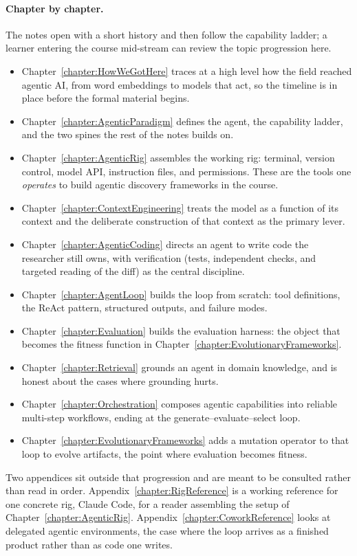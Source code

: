 \paragraph{Chapter by chapter.}
The notes open with a short history and then follow the capability ladder; a learner entering the course mid-stream can review the topic progression here.
\begin{itemize}
\item Chapter~\ref{chapter:HowWeGotHere} traces at a high level how the field reached agentic AI, from word embeddings to models that act, so the timeline is in place before the formal material begins.
\item Chapter~\ref{chapter:AgenticParadigm} defines the agent, the capability ladder, and the two spines the rest of the notes builds on.
\item Chapter~\ref{chapter:AgenticRig} assembles the working rig: terminal, version control, model API, instruction files, and permissions. These are the tools one \emph{operates} to build agentic discovery frameworks in the course.
\item Chapter~\ref{chapter:ContextEngineering} treats the model as a function of its context and the deliberate construction of that context as the primary lever.
\item Chapter~\ref{chapter:AgenticCoding} directs an agent to write code the researcher still owns, with verification (tests, independent checks, and targeted reading of the diff) as the central discipline.
\item Chapter~\ref{chapter:AgentLoop} builds the loop from scratch: tool definitions, the ReAct pattern, structured outputs, and failure modes.
\item Chapter~\ref{chapter:Evaluation} builds the evaluation harness: the object that becomes the fitness function in Chapter~\ref{chapter:EvolutionaryFrameworks}.
\item Chapter~\ref{chapter:Retrieval} grounds an agent in domain knowledge, and is honest about the cases where grounding hurts.
\item Chapter~\ref{chapter:Orchestration} composes agentic capabilities into reliable multi-step workflows, ending at the generate--evaluate--select loop.
\item Chapter~\ref{chapter:EvolutionaryFrameworks} adds a mutation operator to that loop to evolve artifacts, the point where evaluation becomes fitness.
\end{itemize}
Two appendices sit outside that progression and are meant to be consulted rather than read in order.
Appendix~\ref{chapter:RigReference} is a working reference for one concrete rig, Claude Code, for a reader assembling the setup of Chapter~\ref{chapter:AgenticRig}.
Appendix~\ref{chapter:CoworkReference} looks at delegated agentic environments, the case where the loop arrives as a finished product rather than as code one writes.

